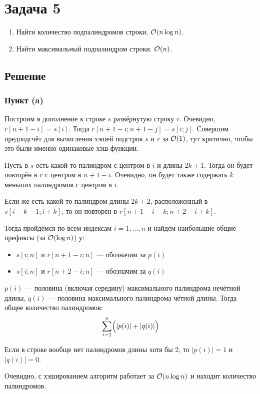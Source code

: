 \section{Задача 5}
\begin{enumerate}
    \item Найти количество подпалиндромов строки. $\mathcal{O}(n \log n)$.
    \item Найти максимальный подпалиндром строки. $\mathcal{O}(n)$.
\end{enumerate}

\subsection{Решение}
\subsubsection{Пункт (a)}
Построим в дополнение к строке $s$ развёрнутую строку $r$.
Очевидно, $r[n + 1 - i] = s[i]$.
Тогда $r[n + 1 - i; n + 1 - j] = s[i; j]$.
Совершим предподсчёт для вычисления хэшей подстрок $s$ и $r$ за $\mathcal{O}(1)$,
тут критично, чтобы это были именно одинаковые хэш-функции.

Пусть в $s$ есть какой-то палиндром с центром в $i$ и длины $2k+1$.
Тогда он будет повторён в $r$ с центром в $n + 1 - i$.
Очевидно, он будет также содержать $k$ меньших палиндромов с центром в $i$.

Если же есть какой-то палиндром длины $2k + 2$,
расположенный в $s[i - k - 1; i + k]$,
то он повторён в $r[n + 1 - i - k; n + 2 - i + k]$.

Тогда пройдёмся по всем индексам $i=1,\ldots,n$
и найдём наибольшие общие префиксы (за $\mathcal{O}(\log n)$) у:
\begin{itemize}
    \item $s[i; n]$ и $r[n + 1 - i; n]$ --- обозначим за $p(i)$
    \item $s[i; n]$ и $r[n + 2 - i; n]$ --- обозначим за $q(i)$
\end{itemize}

$p(i)$ --- половина (включая середину) максимального палиндрома нечётной длины,
$q(i)$ --- половина максимального палиндрома чётной длины.
Тогда общее количество палиндромов:
\[ \sum_{i=1}^n \Bigl( |p(i)| + |q(i)| \Bigr) \]

Если в строке вообще нет палиндромов длины хотя бы 2,
то $|p(i)| = 1$ и $|q(i)| = 0$.

Очевидно, с хэшированием алгоритм работает за $\mathcal{O}(n \log n)$
и находит количество палиндромов.

